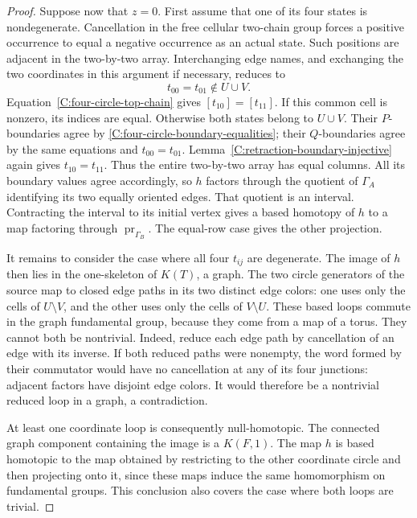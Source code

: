 \begin{proof}
Suppose now that $z=0$.  First assume that one of its four
states is nondegenerate.  Cancellation in the free cellular
two-chain group forces a positive occurrence to equal a
negative occurrence as an actual state.  Such positions
are adjacent in the two-by-two array.  Interchanging edge
names, and exchanging the two coordinates in this argument
if necessary, reduces to
\[
 t_{00}=t_{01}\notin U\cup V.
\]
Equation~\eqref{C:four-circle-top-chain} gives
$[t_{10}]=[t_{11}]$.  If this common cell is nonzero, its
indices are equal.  Otherwise both states belong to $U\cup V$.
Their $P$-boundaries agree by
\eqref{C:four-circle-boundary-equalities}; their $Q$-boundaries
agree by the same equations and $t_{00}=t_{01}$.
Lemma~\ref{C:retraction-boundary-injective} again gives
$t_{10}=t_{11}$.  Thus the entire two-by-two array has equal
columns.  All its boundary values agree accordingly, so
$h$ factors through the quotient of $\Gamma_A$ identifying
its two equally oriented edges.  That quotient is an interval.
Contracting the interval to its initial vertex gives a based
homotopy of $h$ to a map factoring through
$\operatorname{pr}_{\Gamma_B}$.  The equal-row case gives
the other projection.

It remains to consider the case where all four $t_{ij}$
are degenerate.  The image of $h$ then lies in the one-skeleton
of $K(T)$, a graph.  The two circle generators of the source
map to closed edge paths in its two distinct edge colors:
one uses only the cells of $U\setminus V$, and the other
uses only the cells of $V\setminus U$.  These based loops
commute in the graph fundamental group, because they come
from a map of a torus.  They cannot both be nontrivial.
Indeed, reduce each edge path by cancellation of an edge
with its inverse.  If both reduced paths were nonempty,
the word formed by their commutator would have no cancellation
at any of its four junctions: adjacent factors have disjoint
edge colors.  It would therefore be a nontrivial reduced
loop in a graph, a contradiction.

At least one coordinate loop is consequently null-homotopic.
The connected graph component containing the image is a
$K(F,1)$.  The map $h$ is based homotopic to the map obtained
by restricting to the other coordinate circle and then
projecting onto it, since these maps induce the same
homomorphism on fundamental groups.  This conclusion also
covers the case where both loops are trivial.


\end{proof}
